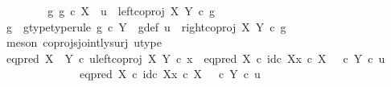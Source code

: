 \begin{isabellebody}
\ \ \isamarkupfalse%
\isanewline
\ \ \ \ \isamarkupfalse%
\ {\isachardoublequoteopen}{\isasymnexists}g{\isachardot}{\kern0pt}\ g\ {\isasymin}\isactrlsub c\ X\ {\isasymand}\ u\ {\isacharequal}{\kern0pt}\ left{\isacharunderscore}{\kern0pt}coproj\ X\ Y\ {\isasymcirc}\isactrlsub c\ g{\isachardoublequoteclose}\isanewline
\ \ \ \ \isamarkupfalse%
\ \isamarkupfalse%
\ g\ \ g{\isacharunderscore}{\kern0pt}type{\isacharbrackleft}{\kern0pt}type{\isacharunderscore}{\kern0pt}rule{\isacharbrackright}{\kern0pt}{\isacharcolon}{\kern0pt}\ {\isachardoublequoteopen}g\ {\isasymin}\isactrlsub c\ Y{\isachardoublequoteclose}\ \ g{\isacharunderscore}{\kern0pt}def{\isacharcolon}{\kern0pt}\ {\isachardoublequoteopen}u\ {\isacharequal}{\kern0pt}\ right{\isacharunderscore}{\kern0pt}coproj\ X\ Y\ {\isasymcirc}\isactrlsub c\ g{\isachardoublequoteclose}\isanewline
\ \ \ \ \ \ \isamarkupfalse%
\ {\isacharparenleft}{\kern0pt}meson\ coprojs{\isacharunderscore}{\kern0pt}jointly{\isacharunderscore}{\kern0pt}surj\ u{\isacharunderscore}{\kern0pt}type{\isacharparenright}{\kern0pt}\isanewline
\isanewline
\ \ \ \ \isamarkupfalse%
\ {\isachardoublequoteopen}eq{\isacharunderscore}{\kern0pt}pred\ {\isacharparenleft}{\kern0pt}X\ {\isasymCoprod}\ Y{\isacharparenright}{\kern0pt}\ {\isasymcirc}\isactrlsub c\ {\isasymlangle}u{\isacharcomma}{\kern0pt}left{\isacharunderscore}{\kern0pt}coproj\ X\ Y\ {\isasymcirc}\isactrlsub c\ x{\isasymrangle}\ {\isacharequal}{\kern0pt}\ {\isacharparenleft}{\kern0pt}eq{\isacharunderscore}{\kern0pt}pred\ X\ {\isasymcirc}\isactrlsub c\ {\isasymlangle}id\isactrlsub c\ X{\isacharcomma}{\kern0pt}x\ {\isasymcirc}\isactrlsub c\ {\isasymbeta}\isactrlbsub X\isactrlesub {\isasymrangle}{\isacharparenright}{\kern0pt}\ {\isasymamalg}\ {\isacharparenleft}{\kern0pt}{\isasymf}\ {\isasymcirc}\isactrlsub c\ {\isasymbeta}\isactrlbsub Y\isactrlesub {\isacharparenright}{\kern0pt}\ {\isasymcirc}\isactrlsub c\ u{\isachardoublequoteclose}\ \ \isanewline
\ \ \ \ \isamarkupfalse%
\ {\isacharminus}{\kern0pt}\isanewline
\ \ \ \ \ \ \isamarkupfalse%
\ {\isachardoublequoteopen}{\isacharparenleft}{\kern0pt}eq{\isacharunderscore}{\kern0pt}pred\ X\ {\isasymcirc}\isactrlsub c\ {\isasymlangle}id\isactrlsub c\ X{\isacharcomma}{\kern0pt}x\ {\isasymcirc}\isactrlsub c\ {\isasymbeta}\isactrlbsub X\isactrlesub {\isasymrangle}{\isacharparenright}{\kern0pt}\ {\isasymamalg}\ {\isacharparenleft}{\kern0pt}{\isasymf}\ {\isasymcirc}\isactrlsub c\ {\isasymbeta}\isactrlbsub Y\isactrlesub {\isacharparenright}{\kern0pt}\ {\isasymcirc}\isactrlsub c\ u\isanewline

\end{isabellebody}
